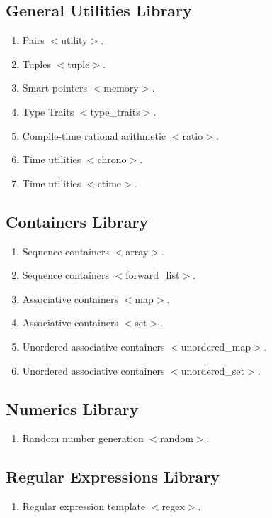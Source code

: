 \documentclass[11pt]{report}
\begin{document}
\subsection{General Utilities Library}
\label{sub-section:General utilities library}
\begin{enumerate}
\item Pairs $<$utility$>$.
\item Tuples $<$tuple$>$.
\item Smart pointers $<$memory$>$.
\item Type Traits $<$type\_traits$>$.
\item Compile-time rational arithmetic $<$ratio$>$.
\item Time utilities $<$chrono$>$.
\item Time utilities $<$ctime$>$.
\end{enumerate}



\subsection{Containers Library}
\label{sub-section:Containers library}
\begin{enumerate}
\item Sequence containers $<$array$>$.
\item Sequence containers $<$forward\_list$>$.
\item Associative containers $<$map$>$.
\item Associative containers $<$set$>$.
\item Unordered associative containers $<$unordered\_map$>$. 
\item Unordered associative containers $<$unordered\_set$>$. 
\end{enumerate}

\subsection{Numerics Library}
\label{sub-section: Numerics library}
\begin{enumerate}
\item Random number generation $<$random$>$.
\end{enumerate}

\subsection{Regular Expressions Library}
\label{sub-section: Regular expressions library}
\begin{enumerate}
\item Regular expression template $<$regex$>$.
\end{enumerate}
\end{document}
